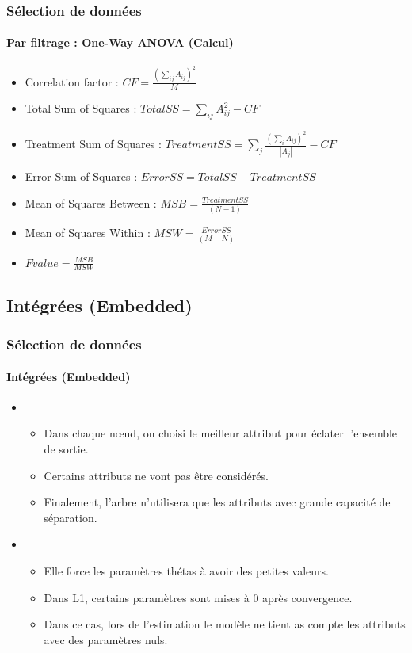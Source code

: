 \documentclass[xcolor=table]{beamer}
\begin{document}
\begin{frame}
	\frametitle{Sélection de données}
	\framesubtitle{Par filtrage : One-Way ANOVA (Calcul)}
	
	\begin{itemize}
		\item Correlation factor : $CF = \frac{(\sum_{ij} A_{ij})^2}{M} $
		\item Total Sum of Squares : $TotalSS = \sum_{ij} A_{ij}^2 - CF$
		\item Treatment Sum of Squares : $TreatmentSS = \sum_j \frac{(\sum_{i} A_{ij})^2}{|A_j|} - CF$
		\item Error Sum of Squares : $ErrorSS = TotalSS - TreatmentSS$
		\item Mean of Squares Between : $MSB = \frac{TreatmentSS}{(N - 1)}$
		\item Mean of Squares Within : $MSW =  \frac{ErrorSS}{(M - N)}$
		\item $Fvalue = \frac{MSB}{MSW}$
	\end{itemize}
	
\end{frame}

\subsection{Intégrées (Embedded)}

\begin{frame}
	\frametitle{Sélection de données}
	\framesubtitle{Intégrées (Embedded)}
	
	\begin{itemize}
		\item {}
		\begin{itemize}
			\item Dans chaque nœud, on choisi le meilleur attribut pour éclater l'ensemble de sortie.
			\item Certains attributs ne vont pas être considérés.
			\item Finalement, l'arbre n'utilisera que les attributs avec grande capacité de séparation.
		\end{itemize}
		\item {}
		\begin{itemize}
			\item Elle force les paramètres thétas à avoir des petites valeurs.
			\item Dans L1, certains paramètres sont mises à 0 après convergence.
			\item Dans ce cas, lors de l'estimation le modèle ne tient as compte les attributs avec des paramètres nuls.
		\end{itemize}
	\end{itemize}
	
\end{frame}
\end{document}
